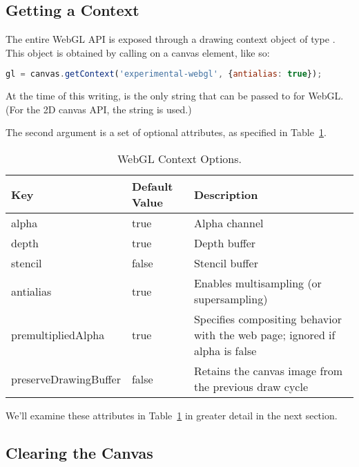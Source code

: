\subsection{Getting a Context}
\label{sec:context}

The entire WebGL API is exposed through a drawing context  object of type  .  This object is obtained by calling   on a canvas element, like so:

\begin{lstlisting}[language=JavaScript]
  gl = canvas.getContext('experimental-webgl', {antialias: true});
\end{lstlisting}

At the time of this writing,   is the only string that can be passed to  for WebGL.  (For the 2D canvas API, the string  is used.)

The second argument is a set of optional attributes, as specified in Table~\ref{tab:ContextAttributes}.

\begin{table}[htb]\centering
  \begin{tabular}{lll}
    \hline
    Key & Default Value & Description \\
    \hline
    alpha & true & Alpha channel \\
    depth & true & Depth buffer \\
    stencil & false & Stencil buffer \\
    antialias & true & Enables multisampling (or supersampling) \\
    premultipliedAlpha & true & Specifies compositing behavior with the web page; ignored if alpha is false \\
    preserveDrawingBuffer & false & Retains the canvas image from the previous draw cycle \\
    \hline
  \end{tabular}
  \caption{WebGL Context Options.}
  \label{tab:ContextAttributes}
\end{table}

We'll examine these attributes in Table~\ref{tab:ContextAttributes} in greater detail in the next section.


\subsection{Clearing the Canvas}

